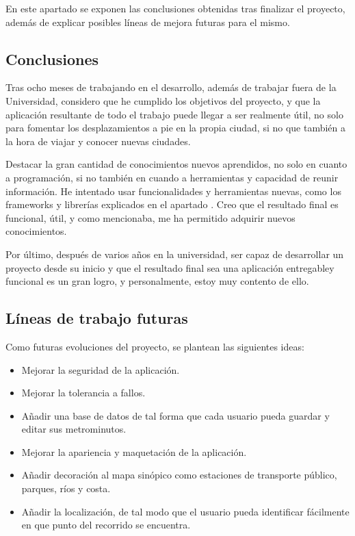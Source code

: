 
En este apartado se exponen las conclusiones obtenidas tras finalizar el proyecto, además de explicar posibles líneas de mejora futuras para el mismo.

\subsection{Conclusiones}
Tras ocho meses de trabajando en el desarrollo, además de trabajar fuera de la Universidad, considero que he cumplido los objetivos del proyecto, y que la aplicación resultante de todo el trabajo puede llegar a ser realmente útil, no solo para fomentar los desplazamientos a pie en la propia ciudad, si no que también a la hora de viajar y conocer nuevas ciudades.


Destacar la gran cantidad de conocimientos nuevos aprendidos, no solo en cuanto a programación, si no también en cuando a herramientas y capacidad de reunir información. He intentado usar funcionalidades y herramientas nuevas, como los frameworks y librerías explicados en el apartado . Creo que el resultado final es funcional, útil, y como mencionaba, me ha permitido adquirir nuevos conocimientos.


Por último, después de varios años en la universidad, ser capaz de desarrollar un proyecto desde su inicio y que el resultado final sea una aplicación entregabley funcional es un gran logro, y personalmente, estoy muy contento de ello.


\subsection{Líneas de trabajo futuras}\label{futuras}
Como futuras evoluciones del proyecto, se plantean las siguientes ideas:

\begin{itemize}
	\item Mejorar la seguridad de la aplicación.
	\item Mejorar la tolerancia a fallos.
	\item Añadir una base de datos de tal forma que cada usuario pueda guardar y editar sus metrominutos.
	\item Mejorar la apariencia y maquetación de la aplicación.
	\item Añadir decoración al mapa sinópico como estaciones de transporte público, parques, ríos y costa.
	\item Añadir la localización, de tal modo que el usuario pueda identificar fácilmente en que punto del recorrido se encuentra.
\end{itemize}
